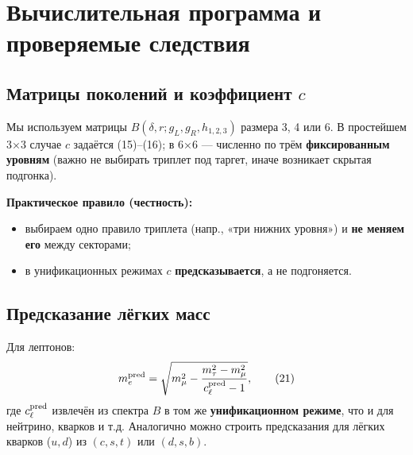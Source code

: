 \documentclass[12pt,a4paper]{article}
\begin{document}
\section{Вычислительная программа и проверяемые следствия}

\subsection{Матрицы поколений и коэффициент \(c\)}
Мы используем матрицы \(B(\delta, r; g_L, g_R, h_{1,2,3})\) размера 3, 4 или 6. В простейшем 3×3 случае \(c\) задаётся (15)–(16); в 6×6 — численно по трём \textbf{фиксированным уровням} (важно не выбирать триплет под таргет, иначе возникает скрытая подгонка).

\textbf{Практическое правило (честность):}
\begin{itemize}
    \item выбираем одно правило триплета (напр., «три нижних уровня») и \textbf{не меняем его} между секторами;
    \item в унификационных режимах \(c\) \textbf{предсказывается}, а не подгоняется.
\end{itemize}

\subsection{Предсказание лёгких масс}
Для лептонов:
\[
m_e^{\rm pred} = \sqrt{m_\mu^2 - \frac{m_\tau^2 - m_\mu^2}{c_\ell^{\rm pred} - 1}}, \tag{21}
\]
где \(c_\ell^{\rm pred}\) извлечён из спектра \(B\) в том же \textbf{унификационном режиме}, что и для нейтрино, кварков и т.д. Аналогично можно строить предсказания для лёгких кварков (\(u,d\)) из \((c,s,t)\) или \((d,s,b)\).
\end{document}
